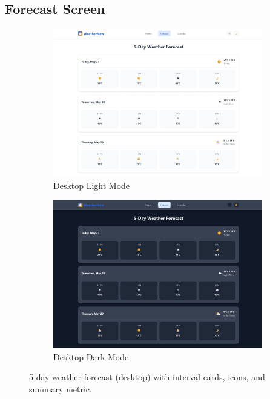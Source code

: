 \documentclass[11pt,a4paper]{article}
\begin{document}
\subsection{Forecast Screen}
\FloatBarrier
\begin{figure}[H]
  \centering
  \begin{subfigure}{0.48\linewidth}
    \includegraphics[width=\linewidth]{forecast_lightmode.jpeg}
    \caption{Desktop Light Mode}
  \end{subfigure}\hfill
  \begin{subfigure}{0.48\linewidth}
    \includegraphics[width=\linewidth]{forecast_darkmode.jpeg}
    \caption{Desktop Dark Mode}
  \end{subfigure}
  \caption{5-day weather forecast (desktop) with interval cards, icons, and summary metric.}
  \label{fig:forecast_desktop}
\end{figure}
\FloatBarrier
\end{document}
